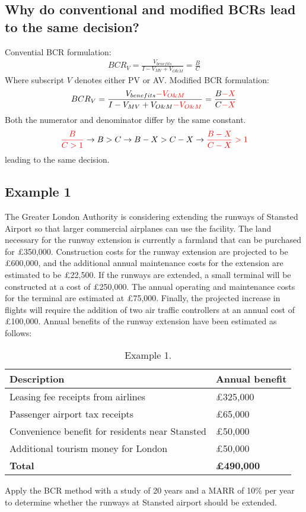 \documentclass[class=report, crop=false, 12pt,a4paper]{standalone}
\begin{document}
\subsection{Why do conventional and modified BCRs lead to the same decision?}
Convential BCR formulation:
\begin{gather}
	BCR_V = \frac{V_{benefits}}{I - V_{MV}+V_{O\& M}} = \frac{B}{C}
\end{gather}
Where subscript $V$ denotes either PV or AV. Modified BCR formulation:
\begin{gather}
	BCR_V = \frac{V_{benefits} \textcolor{red}{-V_{O\&M}}}{I - V_{MV} + V_{O\&M} \textcolor{red}{-V_{O\&M}}} = \frac{B\textcolor{red}{-X}}{C\textcolor{red}{-X}}
\end{gather}
Both the numerator and denominator differ by the same constant.
\begin{gather}
	\textcolor{red}{\frac{B}{C>1}}\rightarrow B > C \rightarrow B - X > C - X \rightarrow \textcolor{red}{\frac{B-X}{C-X}>1}
\end{gather}
leading to the same decision.
\subsection{Example 1}
The Greater London Authority is considering extending the runways of Stansted Airport so that larger commercial airplanes can use the facility. The land necessary for the runway extension is currently a farmland that can be purchased for £350,000. Construction costs for the runway extension are projected to be £600,000, and the additional annual maintenance costs for the extension are estimated to be £22,500. If the runways are extended, a small terminal will be constructed at a cost of £250,000. The annual operating and maintenance costs for the terminal are estimated at £75,000. Finally, the projected increase in flights will require the addition of two air traffic controllers at an annual cost of £100,000. Annual benefits of the runway extension have been estimated as follows:
\begin{table}
	\centering
	\begin{tabular}{@{}ll@{}}
		\toprule
		\textbf{Description} & \textbf{Annual benefit}\\
		\midrule
		Leasing fee receipts from airlines & £325,000\\
		Passenger airport tax receipts & £65,000\\
		Convenience benefit for residents near Stansted & £50,000\\
		Additional tourism money for London & £50,000\\
		\midrule
		\textbf{Total} & \textbf{£490,000}\\
		\bottomrule
	\end{tabular}
	\caption{Example 1.}
\end{table}
Apply the BCR method with a study of 20 years and a MARR of 10\% per year to determine whether the runways at Stansted airport should be extended.
\end{document}
